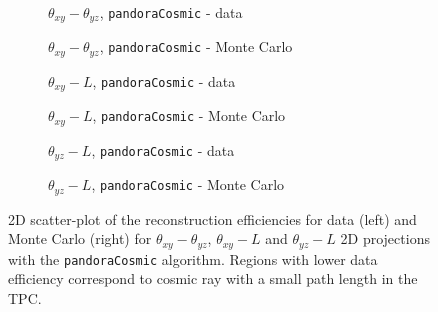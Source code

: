 \documentclass[a4paper]{scrartcl}
\begin{document}
\begin{figure}[htbp]
  \begin{subfigure}{0.52\textwidth}
    \caption{$\theta_{xy} - \theta_{yz}$, \texttt{pan\-do\-ra\-Co\-smic} - data} \label{fig:2d_pc1}
  \end{subfigure}
  \begin{subfigure}{0.52\textwidth}
    \caption{$\theta_{xy} - \theta_{yz}$, \texttt{pan\-do\-ra\-Co\-smic} - Monte Carlo}\label{fig:2d_pc1_mc}
  \end{subfigure}
  \begin{subfigure}{0.52\textwidth}
    \caption{$\theta_{xy} - L$, \texttt{pan\-do\-ra\-Co\-smic} - data}\label{fig:2d_pc2}
  \end{subfigure}
  \begin{subfigure}{0.52\textwidth}
    \caption{$\theta_{xy} - L$, \texttt{pan\-do\-ra\-Co\-smic} - Monte Carlo}\label{fig:2d_pc2_mc}
  \end{subfigure}
  \begin{subfigure}{0.52\textwidth}
    \caption{$\theta_{yz} - L$, \texttt{pan\-do\-ra\-Co\-smic} - data}\label{fig:2d_pc3}
  \end{subfigure}
  \begin{subfigure}{0.52\textwidth}
    \caption{$\theta_{yz} - L$, \texttt{pan\-do\-ra\-Co\-smic} - Monte Carlo}\label{fig:2d_pc3_mc}
  \end{subfigure}
  \caption{2D scatter-plot of the reconstruction efficiencies for data (left) and Monte Carlo (right) for $\theta_{xy} - \theta_{yz}$, $\theta_{xy} - L$ and $\theta_{yz} - L$ 2D projections with the \texttt{pandoraCosmic} algorithm. Regions with lower data efficiency correspond to cosmic ray with a small path length in the TPC.} \label{fig:2deff_pandora}
\end{figure}
\end{document}
